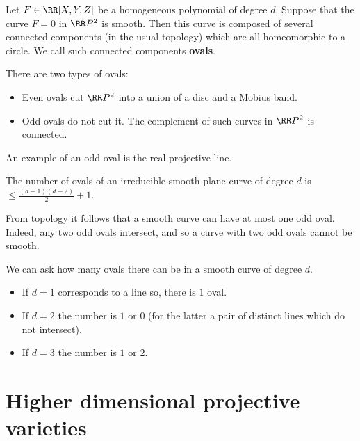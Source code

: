 \documentclass[12pt, a4paper]{article}
\begin{document}
\begin{definition}
    Let \(F \in \RR[X,Y,Z]\) be a homogeneous polynomial of degree \(d\). Suppose that the curve \(F=0\) in \(\RR P^2\) is smooth. Then this curve is composed of several connected components (in the usual topology) which are all homeomorphic to a circle. We call such connected components \textbf{ovals}.
\end{definition}

\begin{definition}
    There are two types of ovals:
    \begin{itemize}
        \item Even ovals cut \(\RR P^2\) into a union of a disc and a Mobius band.
        \item Odd ovals do not cut it. The complement of such curves in \(\RR P^2\) is connected. 
    \end{itemize}
\end{definition}

\begin{example}
    An example of an odd oval is the real projective line.
\end{example}

\begin{mdthm}
    The number of ovals of an irreducible smooth plane curve of degree \(d\) is \(\leq \frac{(d-1)(d-2)}{2}+1\). 
\end{mdthm}

\begin{mdremark}
    From topology it follows that a smooth curve can have at most one odd oval. Indeed, any two odd ovals intersect, and so a curve with two odd ovals cannot be smooth.
\end{mdremark}

\begin{mdexample}
    We can ask how many ovals there can be in a smooth curve of degree \(d\). 
    \begin{itemize}
        \item If \(d=1\) corresponds to a line so, there is \(1\) oval.
        \item If \(d=2\) the number is \(1\) or \(0\) (for the latter a pair of distinct lines which do not intersect).
        \item If \(d=3\) the number is \(1\) or \(2\). 
    \end{itemize}
\end{mdexample}

\section{Higher dimensional projective varieties}
\end{document}

